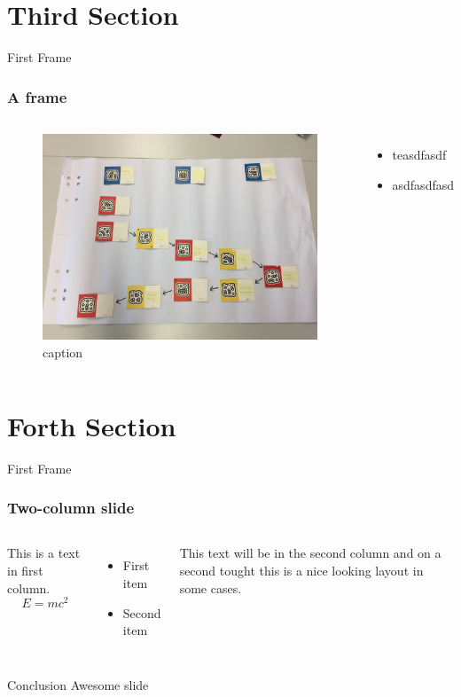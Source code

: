 \documentclass{beamer}
\begin{document}
  \section{Third Section}
  \begin{frame}{First Frame}
	\frametitle{A frame}
	\begin{columns}
	  	\begin{figure}[h]
	     \centering	
	     \includegraphics[width=.9\textwidth]{figures/linienlegemethode.jpg}
	     \caption{caption}
	     \label{fig:figures_linienlegemethode}
	    \end{figure}
	  \begin{itemize}
		  \item teasdfasdf
		  \item asdfasdfasd
		 \end{itemize}
	  \end{columns}
  \end{frame}
  \section{Forth Section}
  \begin{frame}{First Frame}
	\frametitle{Two-column slide}
 
	\begin{columns}
 
	\column{0.5\textwidth}
	This is a text in first column.
	$$E=mc^2$$
	\begin{itemize}
	\item First item
	\item Second item
	\end{itemize}
 
	\column{0.5\textwidth}
	This text will be in the second column
	and on a second tought this is a nice looking
	layout in some cases.
	\end{columns}
  \end{frame}
  \begin{frame}[label=conclusion, standout]{Conclusion} Awesome slide
  \end{frame}
\end{document}
